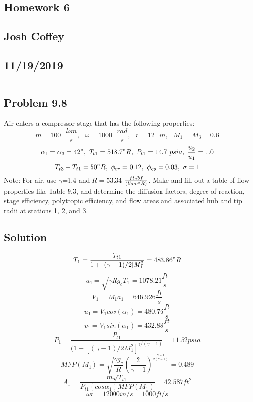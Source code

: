 \documentclass[preview,12pt]{article}
\begin{document}
\begin{center}
    \section*{Homework 6}
    \subsection*{Josh Coffey}
    \subsection*{11/19/2019}
\end{center}
$$$$
\begin{center}
    \section*{Problem 9.8}
\end{center}
Air enters a compressor stage that has the following properties:
$$\dot m=100\textrm{ }\frac{lbm}{s},\textrm{ }\omega = 1000\textrm{ }\frac{rad}{s},\textrm{ }r=12\textrm{ }in,\textrm{ }M_1=M_3=0.6$$
$$\alpha_1=\alpha_3=42 \degree,\textrm{ }T_{t1}=518.7\degree R,\textrm{ }P_{t1}=14.7\textrm{ }psia,\textrm{ }\frac{u_2}{u_1}=1.0$$
$$T_{t3}-T_{t1}=50\degree R,\textrm{ }\phi_{cr}=0.12,\textrm{ }\phi_{cs}=0.03,\textrm{ }\sigma=1$$
Note: For air, use $\gamma$=1.4 and $R=53.34$ $\frac{ft\cdot lbf}{(lbm \cdot \degree R)}$.  Make and fill out a table of flow properties like Table 9.3, and determine the diffusion factors, degree of reaction, stage efficiency, polytropic efficiency, and flow areas and associated hub and tip radii at stations 1, 2, and 3.

\begin{center}
    \section*{Solution}
\end{center}

$$T_1=\frac{T_{t1}}{1+[(\gamma-1)/2]M_1^2}=483.86\degree R$$
$$a_1=\sqrt{\gamma R g_c T_1}=1078.21\frac{ft}{s}$$
$$V_1=M_1a_1=646.926\frac{ft}{s}$$
$$u_1=V_1cos(\alpha_1)=480.76\frac{ft}{s}$$
$$v_1=V_1sin(\alpha_1)=432.88\frac{ft}{s}$$
$$P_1=\frac{P_{t1}}{(1+[(\gamma-1)/2M_1^2]^{\gamma/(\gamma-1)}}=11.52psia$$
$$MFP(M_1)=\sqrt{\frac{\gamma g_c}{R}}\left(\frac{2}{\gamma+1}\right)^{\frac{\gamma+1}{2(\gamma-1)}}=0.489$$
$$A_1=\frac{\dot{m}\sqrt{T_{t1}}}{P_{t1}(cos\alpha_1)MFP(M_1)}=42.587ft^2$$
$$\omega r = 12000 in/s = 1000 ft/s$$
\end{document}
